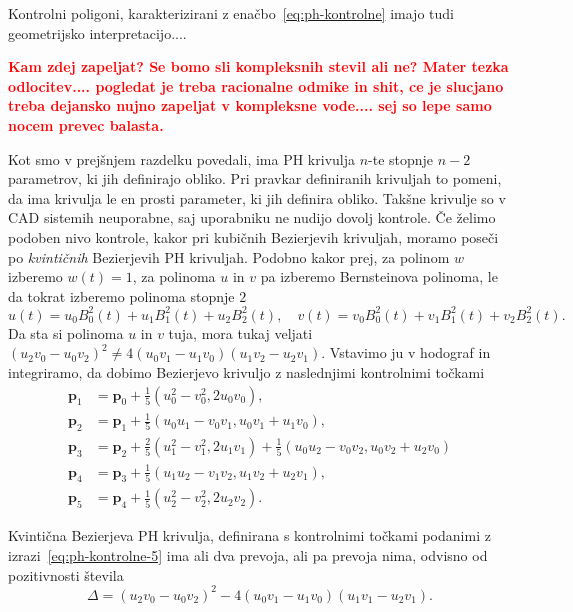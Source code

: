 \documentclass[isrm2, tisk]{fmfdelo}
\newcommand{\p}{\textbf{p}}
\newcommand{\mycomment}[1]{\textbf{\textcolor{red}{#1}}}
\begin{document}
    Kontrolni poligoni, karakterizirani z enačbo~\eqref{eq:ph-kontrolne} imajo tudi geometrijsko interpretacijo....

    \mycomment{ Kam zdej zapeljat? Se bomo sli kompleksnih stevil ali ne? Mater tezka odlocitev.... pogledat je treba racionalne odmike in shit, ce je slucjano treba dejansko nujno zapeljat v kompleksne vode.... sej so lepe samo nocem prevec balasta.}

    Kot smo v prejšnjem razdelku povedali, ima PH krivulja $n$-te stopnje $n-2$ parametrov, ki jih definirajo obliko.
    Pri pravkar definiranih krivuljah to pomeni, da ima krivulja le en prosti parameter, ki jih definira obliko.
    Takšne krivulje so v CAD sistemih neuporabne, saj uporabniku ne nudijo dovolj kontrole.
    Če želimo podoben nivo kontrole, kakor pri kubičnih Bezierjevih krivuljah, moramo poseči po \textit{kvintičnih} Bezierjevih PH krivuljah.
    Podobno kakor prej, za polinom $w$ izberemo $w(t)=1$, za polinoma $u$ in $v$ pa izberemo Bernsteinova polinoma, le da tokrat izberemo polinoma stopnje $2$
    \[u(t)=u_0B_{0}^{2}(t)+u_1B_{1}^{2}(t)+u_2B_{2}^{2}(t),\quad v(t)=v_0B_{0}^{2}(t)+v_1B_{1}^{2}(t)+v_2B_{2}^{2}(t).\]
    Da sta si polinoma $u$ in $v$ tuja, mora tukaj veljati $(u_2 v_0 -u_0 v_2)^2 \neq 4(u_0 v_1 - u_1 v_0)(u_1 v_2-u_2v_1)$.
    Vstavimo ju v hodograf in integriramo, da dobimo Bezierjevo krivuljo z naslednjimi kontrolnimi točkami
    \begin{align}
        \p_1 &=\p_0+\frac{1}{5}(u_0^2-v_0^2,2u_0v_0), \nonumber\\
        \p_2 &= \p_1+\frac{1}{5}(u_0u_1-v_0v_1, u_0v_1+u_1v_0),\nonumber\\
        \p_3 &= \p_2 + \frac{2}{5}(u_1^2-v_1^2, 2u_1v_1) + \frac{1}{5}(u_0u_2-v_0v_2, u_0v_2+u_2v_0) \nonumber \\
        \p_4 &= \p_3+\frac{1}{5}(u_1u_2-v_1v_2, u_1v_2+u_2v_1),\nonumber\\
        \p_5 &=\p_4+\frac{1}{5}(u_2^2-v_2^2,2u_2v_2).  \label{eq:ph-kontrolne-5}
    \end{align}

    \begin{lema}
        Kvintična Bezierjeva PH krivulja, definirana s kontrolnimi točkami podanimi z izrazi~\eqref{eq:ph-kontrolne-5} ima ali dva prevoja, ali pa prevoja nima, odvisno od pozitivnosti števila \[\Delta = (u_2v_0-u_0v_2)^2 - 4(u_0v_1-u_1v_0)(u_1v_1-u_2v_1).\]
    \end{lema}
\end{document}
